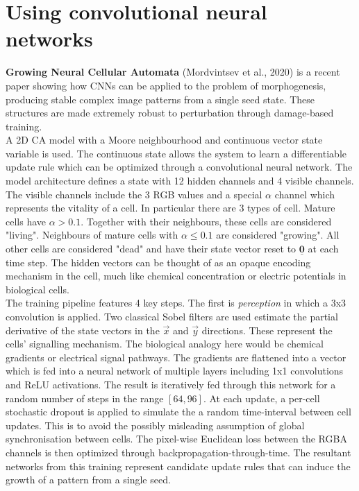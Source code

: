 \section{Using convolutional neural networks}

\noindent
\textbf{Growing Neural Cellular Automata} (Mordvintsev et al., 2020) \cite{mordvintsev2020growing} is a recent paper showing how CNNs can be applied to the problem of morphogenesis, producing stable complex image patterns from a single seed state. These structures are made extremely robust to perturbation through damage-based training. \\

A 2D CA model with a Moore neighbourhood and continuous vector state variable is used.
The continuous state allows the system to learn a differentiable update rule which can be optimized through a convolutional neural network.
The model architecture defines a state with 12 hidden channels and 4 visible channels.
The visible channels include the 3 RGB values and a special $\alpha$ channel which represents the vitality of a cell.
In particular there are 3 types of cell.
Mature cells have $\alpha > 0.1$.
Together with their neighbours, these cells are considered "living".
Neighbours of mature cells with $\alpha \leq 0.1$ are considered "growing".
All other cells are considered "dead" and have their state vector reset to $\underline{\mathbf{0}}$ at each time step.
The hidden vectors can be thought of as an opaque encoding mechanism in the cell, much like chemical concentration or electric potentials in biological cells.\\

The training pipeline features 4 key steps.
The first is \textit{perception} in which a 3x3 convolution is applied.
Two classical Sobel filters are used estimate the partial derivative of the state vectors in the $\overrightarrow{x}$ and $\overrightarrow{y}$ directions.
These represent the cells' signalling mechanism.
The biological analogy here would be chemical gradients or electrical signal pathways.
The gradients are flattened into a vector which is fed into a neural network of multiple layers including 1x1 convolutions and ReLU activations.
The result is iteratively fed through this network for a random number of steps in the range $[64, 96]$.
At each update, a per-cell stochastic dropout is applied to simulate the a random time-interval between cell updates.
This is to avoid the possibly misleading assumption of global synchronisation between cells.
The pixel-wise Euclidean loss between the RGBA channels is then optimized through backpropagation-through-time. The resultant networks from this training represent candidate update rules that can induce the growth of a pattern from a single seed.\\

